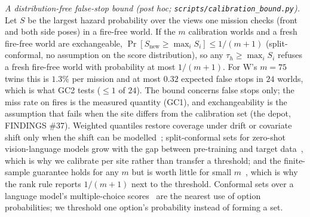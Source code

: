 \documentclass[conference]{IEEEtran}
\begin{document}
\emph{A distribution-free false-stop bound (post hoc; \texttt{scripts/calibration\_bound.py}).} Let $S$ be the largest hazard probability over the views one mission checks (front and both side poses) in a fire-free world. If the $m$ calibration worlds and a fresh fire-free world are exchangeable, $\Pr[S_{\mathrm{new}}\ge\max_i S_i]\le 1/(m+1)$ (split-conformal, no assumption on the score distribution), so any $\tau_h\ge\max_i S_i$ refuses a fresh fire-free world with probability at most $1/(m+1)$. For W's $m=75$ twins this is $1.3\%$ per mission and at most $0.32$ expected false stops in $24$ worlds, which is what GC2 tests ($\le1$ of $24$). The bound concerns false stops only; the miss rate on fires is the measured quantity (GC1), and exchangeability is the assumption that fails when the site differs from the calibration set (the depot, FINDINGS \#37). Weighted quantiles restore coverage under drift or covariate shift only when the shift can be modelled~\cite{tibshirani2019covariate,barber2023beyond}; split-conformal sets for zero-shot vision-language models grow with the gap between pre-training and target data~\cite{silvarodriguez2025conformalzeroshot}, which is why we calibrate per site rather than transfer a threshold; and the finite-sample guarantee holds for any $m$ but is worth little for small $m$~\cite{kladny2025finitecp}, which is why the rank rule reports $1/(m+1)$ next to the threshold. Conformal sets over a language model's multiple-choice scores~\cite{kumar2023conformalmcqa} are the nearest use of option probabilities; we threshold one option's probability instead of forming a set.
\end{document}
